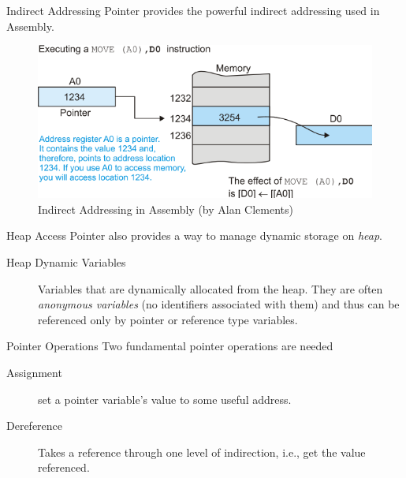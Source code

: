 \documentclass[presentation]{beamer}
\begin{document}
\begin{frame}[label={sec:orgheadline46}]{Indirect Addressing}
Pointer provides the powerful indirect addressing used in Assembly.

\begin{figure}[htb]
\centering
\includegraphics[width=.9\linewidth]{img/indirect-addressing.png}
\caption{Indirect Addressing in Assembly (by Alan Clements)}
\end{figure}
\end{frame}

\begin{frame}[label={sec:orgheadline47}]{Heap Access}
Pointer also provides a way to manage dynamic storage on \emph{heap}.

\begin{description}
\item[{Heap Dynamic Variables}] Variables that are dynamically
allocated from the heap.  They are often \emph{anonymous variables}
(no identifiers associated with them) and thus can be
referenced only by pointer or reference type variables.
\end{description}
\end{frame}

\begin{frame}[label={sec:orgheadline48}]{Pointer Operations}
Two fundamental pointer operations are needed
\begin{description}
\item[{Assignment}] set a pointer variable's value to some useful
address.
\item[{Dereference}] Takes a reference through one level of
indirection, i.e., get the value referenced.
\end{description}
\end{frame}
\end{document}
